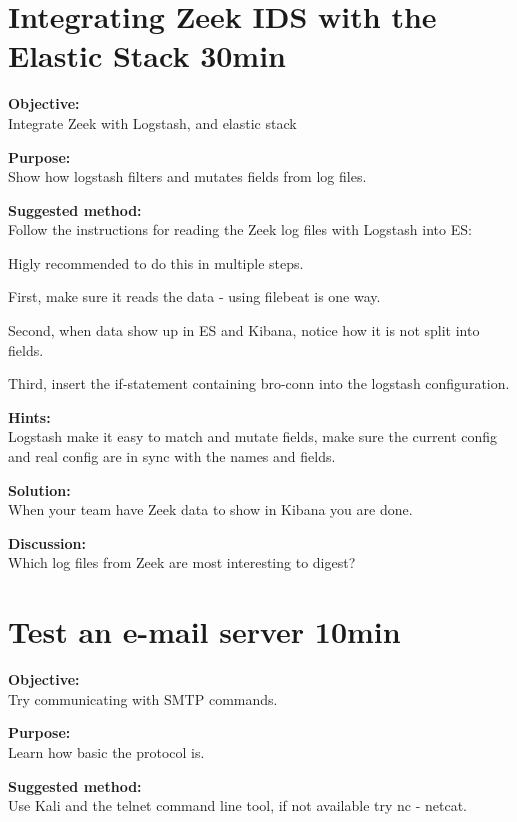 \documentclass[a4paper,11pt,notitlepage]{report}
\begin{document}
\chapter{Integrating Zeek IDS with the Elastic Stack 30min}
\label{ex:zeek-to-elastic}

{\bf Objective:}\\
Integrate Zeek with Logstash, and elastic stack

{\bf Purpose:}\\
Show how logstash filters and mutates fields from log files.

{\bf Suggested method:}\\
Follow the instructions for reading the Zeek log files with Logstash into ES:\\

Higly recommended to do this in multiple steps.

First, make sure it reads the data - using filebeat is one way.

Second, when data show up in ES and Kibana, notice how it is not split into fields.

Third, insert the if-statement containing bro-conn into the logstash configuration.

{\bf Hints:}\\
Logstash make it easy to match and mutate fields, make sure the current config and real config are in sync with the names and fields.

{\bf Solution:}\\
When your team have Zeek data to show in Kibana you are done.

{\bf Discussion:}\\
Which log files from Zeek are most interesting to digest?



\chapter{Test an e-mail server 10min}
\label{ex:email-server-test}

{\bf Objective:}\\
Try communicating with SMTP commands.

{\bf Purpose:}\\
Learn how basic the protocol is.

{\bf Suggested method:}\\
Use Kali and the telnet command line tool, if not available try nc - netcat.
\end{document}
